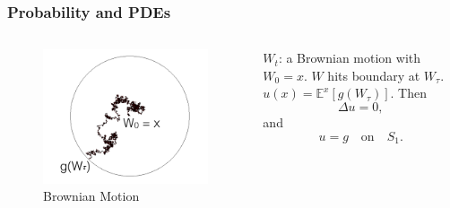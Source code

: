 \documentclass{beamer}
\begin{document}
\begin{frame}
\frametitle{Probability and PDEs}
\begin{columns}
\begin{figure}
\includegraphics[scale = 0.3]{bmotion.png}
\caption{Brownian Motion}
\end{figure}
$W_t$: a Brownian motion with $W_0 = x$. $W$ hits boundary at $W_{\tau}$.  $u(x) = \mathbb{E}^x[g(W_\tau)]$.
Then $$\Delta u = 0,$$ 
and $$u = g\quad \text{on}\quad S_1.$$


\end{columns}
\end{frame}
\end{document}
